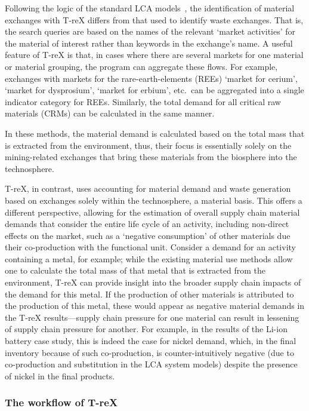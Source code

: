 \documentclass[a4paper,fleqn]{cas-dc}
\begin{document}
Following the logic of the standard LCA models~\cite{ecoinvent2016version3, guinee2004economicallocation},
 the identification of material exchanges with
T-reX differs from that used to identify waste exchanges. That is, the search
queries are based on the names of the relevant `market activities' for the
material of interest rather than keywords in the exchange's name. A useful
feature of T-reX is that, in cases where there are several markets for one
material or material grouping, the program can aggregate these flows. For
example, exchanges with markets for the rare-earth-elements (REEs) `market for
cerium', `market for dysprosium', `market for erbium', etc.\ can be aggregated
into a single indicator category for REEs. Similarly, the total demand for all
critical raw materials (CRMs) can be calculated in the same manner.

In these methods, the material demand is calculated based on the total mass
that is extracted from the environment, thus, their focus is essentially solely
on the mining-related exchanges that bring these materials from the biosphere
into the technosphere.

T-reX, in contrast, uses accounting for material demand and waste generation
based on exchanges solely within the technosphere, a material basis. This
offers a different perspective, allowing for the estimation of overall supply
chain material demands that consider the entire life cycle of an activity,
including non-direct effects on the market, such as a `negative consumption' of
other materials due their co-production with the functional unit. Consider a
demand for an activity containing a metal, for example; while the existing
material use methods allow one to calculate the total mass of that metal that
is extracted from the environment, T-reX can provide insight into the broader
supply chain impacts of the demand for this metal. If the production of other
materials is attributed to the production of this metal, these would appear as
negative material demands in the T-reX results---supply chain pressure for one
material can result in lessening of supply chain pressure for another. For
example, in the results of the Li-ion battery case study, this is indeed the
case for nickel demand, which, in the final inventory because of such
co-production, is counter-intuitively negative (due to co-production and
substitution in the LCA system models) despite the presence of nickel in the
final products.

\subsubsection{The workflow of T-reX}
\end{document}
